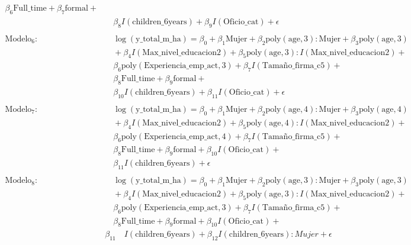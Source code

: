 \documentclass[12pt,a4paper,onecolumn]{article}
\begin{document}
\begin{align*}
\beta_6 \text{Full\_time} + \beta_7 \text{formal} + \\ & \quad 
\beta_8 I(\text{children\_6years}) + \beta_9 I(\text{Oficio\_cat}) + \epsilon \\
\\
\text{Modelo}_6: & \quad \log(\text{y\_total\_m\_ha}) = \beta_0 + \beta_1 \text{Mujer} + \beta_2 \text{poly}(\text{age}, 3):\text{Mujer} + \beta_3 \text{poly}(\text{age}, 3) \\
& \quad + \beta_4 I(\text{Max\_nivel\_educacion2}) + \beta_5 \text{poly}(\text{age}, 3) : I(\text{Max\_nivel\_educacion2}) + \\
& \quad \beta_6 \text{poly}(\text{Experiencia\_emp\_act}, 3) + \beta_7 I(\text{Tamaño\_firma\_c5}) + \\
& \quad \beta_8 \text{Full\_time} + \beta_9 \text{formal} + \\ & \quad \beta_{10} I(\text{children\_6years}) + \beta_{11} I(\text{Oficio\_cat}) + \epsilon \\
\\
\text{Modelo}_7: & \quad \log(\text{y\_total\_m\_ha}) = \beta_0 + \beta_1 \text{Mujer} + \beta_2 \text{poly}(\text{age}, 4) : \text{Mujer} + \beta_3 \text{poly}(\text{age}, 4) \\
& \quad + \beta_4 I(\text{Max\_nivel\_educacion2}) + \beta_5 \text{poly}(\text{age}, 4) : I(\text{Max\_nivel\_educacion2}) + \\
& \quad \beta_6 \text{poly}(\text{Experiencia\_emp\_act}, 4)  + \beta_7 I(\text{Tamaño\_firma\_c5}) + \\
& \quad \beta_8 \text{Full\_time} + \beta_9 \text{formal} + \beta_{10} I(\text{Oficio\_cat})+\\ & \quad \beta_{11} I(\text{children\_6years}) + \epsilon \\
\\
\text{Modelo}_8: & \quad \log(\text{y\_total\_m\_ha}) = \beta_0 + \beta_1 \text{Mujer} + \beta_2 \text{poly}(\text{age}, 3) : \text{Mujer} + \beta_3 \text{poly}(\text{age}, 3) \\
& \quad + \beta_4 I(\text{Max\_nivel\_educacion2}) + \beta_5 \text{poly}(\text{age}, 3) : I(\text{Max\_nivel\_educacion2}) + \\
& \quad \beta_6 \text{poly}(\text{Experiencia\_emp\_act}, 3) + \beta_7 I(\text{Tamaño\_firma\_c5}) +  \\
& \quad \beta_8 \text{Full\_time} + \beta_9 \text{formal} +  \beta_{10} I(\text{Oficio\_cat}) + \\
& \beta_{11} \quad I(\text{children\_6years}) + \beta_{12} I(\text{children\_6years}):Mujer + \epsilon \\

\end{align*}
\end{document}
